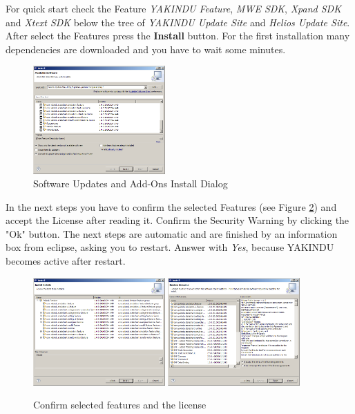 For quick start check the Feature \textit{YAKINDU Feature}, \textit{MWE SDK}, 
\textit{Xpand SDK} and \textit{Xtext SDK} below the tree of
\textit{YAKINDU Update Site} and \textit{Helios Update Site}. After select the 
Features press the \textbf{Install} button. For  the
first installation many dependencies are downloaded and you have to wait some
minutes.

\begin{figure}[ht]
\center
\includegraphics[width=0.45\textwidth]{./Pictures/updateSelected}
\caption{\label{fig:Update}Software Updates and Add-Ons Install Dialog} 
\end{figure}

In the next steps you have to confirm the selected Features (see Figure
\ref{fig:confirmFeatures}) and accept the License after reading it. Confirm the Security
Warning by clicking the "Ok" button. The next
steps are automatic and are finished by an information box from eclipse, asking
you to restart. Answer with \textit{Yes}, because YAKINDU becomes active after
restart.

\begin{figure}[ht] \center
\includegraphics[width=0.45\textwidth]{./Pictures/featureConfirm}
\includegraphics[width=0.45\textwidth]{./Pictures/licences}
\caption{\label{fig:confirmFeatures}Confirm selected features and the license} 
\end{figure}

